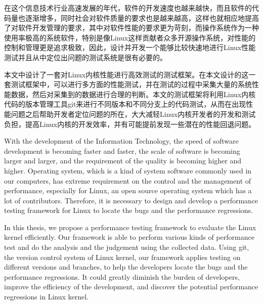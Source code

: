 




\makeatletter



\makeatother





\begin{cabstract}
在这个信息技术行业高速发展的年代，软件的开发速度也越来越快，而且软件的代码量也逐渐增多，同时社会对软件质量的要求也是越来越高，这样也就相应地提高了对软件开发管理的要求，其中对软件性能的要求更为苛刻，而操作系统作为一种使用率极高的系统软件，特别是像Linux这样贡献者众多开源操作系统，对性能的控制和管理更是追求极致，因此，设计并开发一个能够比较快速地进行Linux性能测试并且从中定位出问题的测试系统是很有必要的。

本文中设计了一套对Linux内核性能进行高效测试的测试框架。在本文设计的这一套测试框架中，可以进行多方面的性能测试，并在测试的过程中采集大量的系统性能数据，然后对采集到的数据进行合理的判断。本文的测试框架将利用Linux内核代码的版本管理工具git来进行不同版本和不同分支上的代码测试，从而在出现性能问题之后帮助开发者定位问题的所在，大大减轻Linux内核开发者的开发和测试负担，提高Linux内核的开发效率，并有可能提前发现一些潜在的性能回退问题。
\end{cabstract}



\begin{eabstract}
With the development of the Information Technology, the speed of software development is becoming faster and faster, the scale of software is becoming larger and larger, and the requirement of the quality is becoming higher and higher. Operating system,  which is a kind of system software commonly used in our computers, has extreme requirement on the control and the management of performance, especially for Linux, an open source operating system which has a lot of contributors. Therefore, it is necessary to design and develop a performance testing framework for Linux to locate the bugs and the performance regressions.

In this thesis, we propose a performance testing framework to evaluate the Linux kernel efficiently. Our framework is able to perform various kinds of performance test and do the analysis and the judgement using the collected data. Using git, the version control system of Linux kernel, our framework applies testing on different versions and branches, to help the developers locate the bugs and the performance regressions. It could greatly diminish the burden of developers, improve the efficiency of the development, and discover the potential performance regressions in Linux kernel.
\end{eabstract}

